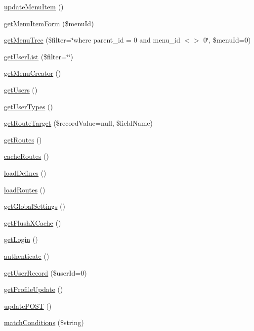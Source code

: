 \begin{DoxyCompactItemize}
\item 
\hyperlink{classKim_a1c8f6358dbec4612dd880ae09cb4a74e}{update\+Menu\+Item} ()
\item 
\hyperlink{classKim_a2a73684a878eac950d34f15ce674f194}{get\+Menu\+Item\+Form} (\$menu\+Id)
\item 
\hyperlink{classKim_acb9933ffdc95c3caab1c94c47d5f4e13}{get\+Menu\+Tree} (\$filter=\char`\"{}where parent\+\_\+id = 0 and menu\+\_\+id $<$$>$ 0\char`\"{}, \$menu\+Id=0)
\item 
\hyperlink{classKim_afce7f678a883aab27b976429e8248d79}{get\+User\+List} (\$filter=\char`\"{}\char`\"{})
\item 
\hyperlink{classKim_a0fb70ab1aedbf3be92bfdd9241944e6b}{get\+Menu\+Creator} ()
\item 
\hyperlink{classKim_a31a5796278c813534e76d2ce91d9eed2}{get\+Users} ()
\item 
\hyperlink{classKim_a03d8b762e1c6d458e714904cd8b02dd6}{get\+User\+Types} ()
\item 
\hyperlink{classKim_a3a5e9863e6bf6bfe54a88f76c3a3c004}{get\+Route\+Target} (\$record\+Value=null, \$field\+Name)
\item 
\hyperlink{classKim_a1e3ce6c13bf4c0b488ff07ddfe95c0ac}{get\+Routes} ()
\item 
\hyperlink{classKim_a5fcd3a64ecd0f244e9db70f0c007b6ba}{cache\+Routes} ()
\item 
\hyperlink{classKim_a8a657ebf9637c9d007c2c66654bf2a6d}{load\+Defines} ()
\item 
\hyperlink{classKim_a99011f068ed5a1f55fd8c5cf2b1aac43}{load\+Routes} ()
\item 
\hyperlink{classKim_a2bcf75443f82b5c8f49b4e82bdcab94d}{get\+Global\+Settings} ()
\item 
\hyperlink{classKim_a54e4f46e005a09de5bda3a2093a86af7}{get\+Flush\+X\+Cache} ()
\item 
\hyperlink{classKim_a7531e4d2f4da4cb34176d40d20ee6401}{get\+Login} ()
\item 
\hyperlink{classKim_abfaef7d8d59b67ed50d46053b0154b1d}{authenticate} ()
\item 
\hyperlink{classKim_a6c3ce83f2f3bc3c7743f1bfa46f30d0e}{get\+User\+Record} (\$user\+Id=0)
\item 
\hyperlink{classKim_acbae7ab945d82706b2be25816578ae71}{get\+Profile\+Update} ()
\item 
\hyperlink{classKim_a3725ce24c9501992a03e6386423e447c}{update\+P\+O\+S\+T} ()
\item 
\hyperlink{classKim_a06415955f55535b121470e7779e92168}{match\+Conditions} (\$string)
$$
\end{DoxyCompactItemize}
